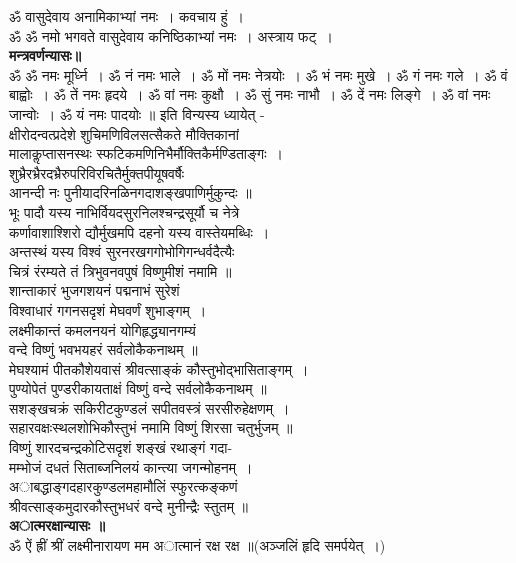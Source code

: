 \documentclass[twoside,top=1.7cm, bottom=1.7cm, outer=1cm,landscape, inner=1.5cm,a5paper,]{book}
\begin{document}
ॐ वासुदेवाय अनामिकाभ्यां नमः~। कवचाय हुं~।\\
ॐ ॐ नमो भगवते वासुदेवाय कनिष्ठिकाभ्यां नमः~। अस्त्राय फट्~।\\
{\bfseries मन्त्रवर्णन्यासः॥}\\
ॐ ॐ नमः मूर्ध्नि~। ॐ नं  नमः भाले~। ॐ मों नमः नेत्रयोः~। 
ॐ भं नमः मुखे~। ॐ गं नमः गले~। ॐ वं बाह्वोः~। 
ॐ तें नमः हृदये~। ॐ वां नमः कुक्षौ~। ॐ सुं नमः नाभौ~। ॐ दें नमः लिङ्गे~। ॐ वां नमः जान्वोः~। ॐ यं नमः पादयोः ॥
 इति विन्यस्य ध्यायेत् -\\
क्षीरोदन्वत्प्रदेशे शुचिमणिविलसत्सैकते मौक्तिकानां\\
     मालाकॢप्तासनस्थः स्फटिकमणिनिभैर्मौक्तिकैर्मण्डिताङ्गः~।\\
शुभ्रैरभ्रैरदभ्रैरुपरिविरचितैर्मुक्तपीयूषवर्षैः\\
     आनन्दी नः पुनीयादरिनळिनगदाशङ्खपाणिर्मुकुन्दः ॥\\[10pt]
भूः पादौ यस्य नाभिर्वियदसुरनिलश्चन्द्रसूर्यौ च नेत्रे\\
     कर्णावाशाश्शिरो द्यौर्मुखमपि दहनो यस्य वास्तेयमब्धिः~।\\[10pt]
अन्तस्थं यस्य विश्वं सुरनरखगगोभोगिगन्धर्वदैत्यैः\\
     चित्रं रंरम्यते तं त्रिभुवनवपुषं विष्णुमीशं नमामि ॥\\
शान्ताकारं भुजगशयनं पद्मनाभं सुरेशं\\
     विश्वाधारं गगनसदृशं मेघवर्णं शुभाङ्गम्~।\\
लक्ष्मीकान्तं कमलनयनं योगिहृद्ध्यानगम्यं\\
     वन्दे विष्णुं भवभयहरं सर्वलोकैकनाथम् ॥\\
मेघश्यामं पीतकौशेयवासं श्रीवत्साङ्कं कौस्तुभोद्भासिताङ्गम्~।\\
पुण्योपेतं पुण्डरीकायताक्षं विष्णुं वन्दे सर्वलोकैकनाथम् ॥\\
सशङ्खचक्रं सकिरीटकुण्डलं सपीतवस्त्रं सरसीरुहेक्षणम्~।\\
सहारवक्षःस्थलशोभिकौस्तुभं नमामि विष्णुं शिरसा चतुर्भुजम् ॥\\[10pt] 
विष्णुं शारदचन्द्रकोटिसदृशं शङ्खं रथाङ्गं गदा-\\
मम्भोजं दधतं सिताब्जनिलयं कान्त्या जगन्मोहनम्~।\\
अाबद्धाङ्गदहारकुण्डलमहामौलिं स्फुरत्कङ्कणं\\
श्रीवत्साङ्कमुदारकौस्तुभधरं वन्दे मुनीन्द्रैः स्तुतम् ॥\\[10pt]
{\bfseries अात्मरक्षान्यासः ॥}\\
ॐ ऐं ह्रीं श्रीं लक्ष्मीनारायण मम अात्मानं रक्ष रक्ष ॥(अञ्जलिं हृदि समर्पयेत्~।)\\
\end{document}
